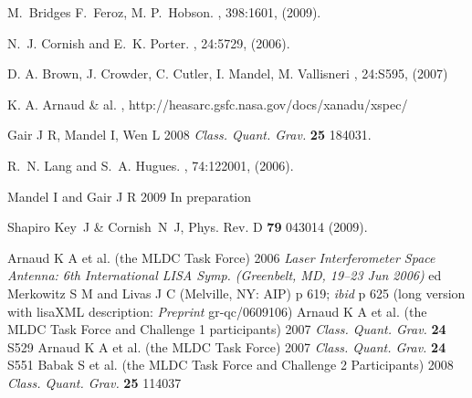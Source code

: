 \documentclass{iopart}
\begin{document}
\begin{thebibliography}{99}
M.~Bridges F.~Feroz, M. P.~Hobson.
, 398:1601, (2009).

N.~J. Cornish and E.~K. Porter.
, 24:5729, (2006).

D. A. Brown, J. Crowder, C. Cutler, I. Mandel, M. Vallisneri
, 24:{S595}, (2007)  

K. A. Arnaud \& al.
, http://heasarc.gsfc.nasa.gov/docs/xanadu/xspec/ 

Gair J R, Mandel I, Wen L 2008 {\em Class. Quant. Grav.} \textbf{25} 184031.

R.~N. Lang and S.~A. Hugues.
, 74:122001, (2006).

Mandel I and Gair J R 2009 In preparation

 Shapiro Key~J \& Cornish~N~J, Phys. Rev. D {\bf 79} 043014 (2009).

 Arnaud K A et al. (the MLDC Task Force) 2006 \textit{Laser Interferometer Space Antenna: 6th International LISA Symp. (Greenbelt, MD, 19--23 Jun 2006)} ed Merkowitz S M and Livas J C (Melville, NY: AIP) p 619; \textit{ibid} p 625 (long version with lisaXML description: \textit{Preprint} gr-qc/0609106)
%
 Arnaud K A et al. (the MLDC Task Force and Challenge 1 participants) 2007 \textit{Class. Quant. Grav.} \textbf{24} S529
%
 Arnaud K A et al. (the MLDC Task Force) 2007 \textit{Class. Quant. Grav.} \textbf{24} S551
%
 Babak S et al. (the MLDC Task Force and Challenge 2 Participants) 2008 \textit{Class. Quant. Grav.} \textbf{25} 114037


\end{thebibliography}
\end{document}
